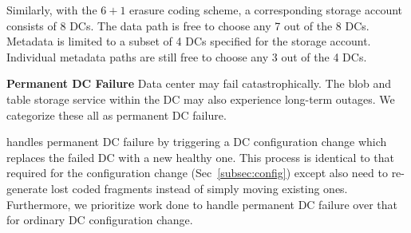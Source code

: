 Similarly, with the $6 + 1$ erasure coding scheme, a corresponding storage
account consists of 8 DCs. The data path is free to choose any 7 out of the 8
DCs. Metadata is limited to a subset of 4 DCs specified for the storage
account. Individual metadata paths are still free to choose any 3 out of the 4
DCs.

{\bf Permanent DC Failure}
Data center may fail catastrophically. The blob and table storage service
within the DC may also experience long-term outages. We categorize these all as
permanent DC failure.

\name handles permanent DC failure by triggering a DC configuration change 
which replaces the failed DC with a new healthy one. This process is identical 
to that required for the configuration change (Sec~\ref{subsec:config}) except
\name also need to re-generate lost coded fragments instead of simply moving
existing ones.  Furthermore, we prioritize work done to handle permanent DC
failure over that for ordinary DC configuration change.

%
%

